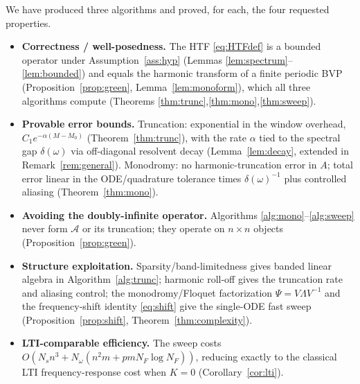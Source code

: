 \documentclass{amsart}
\theoremstyle{definition}
\newcommand{\Acal}{\mathcal{A}}
\begin{document}
We have produced three algorithms and proved, for each, the four requested
properties.
\begin{itemize}
\item \textbf{Correctness / well-posedness.} The HTF \eqref{eq:HTFdef} is a
bounded operator under Assumption~\ref{ass:hyp} (Lemmas
\ref{lem:spectrum}--\ref{lem:bounded}) and equals the harmonic transform of a
finite periodic BVP (Proposition~\ref{prop:green}, Lemma~\ref{lem:monoform}),
which all three algorithms compute (Theorems
\ref{thm:trunc},\ref{thm:mono},\ref{thm:sweep}).
\item \textbf{Provable error bounds.} Truncation: exponential in the window
overhead, $C_1 e^{-\alpha(M-M_0)}$ (Theorem~\ref{thm:trunc}), with the rate
$\alpha$ tied to the spectral gap $\delta(\omega)$ via off-diagonal resolvent
decay (Lemma~\ref{lem:decay}, extended in Remark~\ref{rem:general}). Monodromy:
no harmonic-truncation error in $A$; total error linear in the ODE/quadrature
tolerance times $\delta(\omega)^{-1}$ plus controlled aliasing
(Theorem~\ref{thm:mono}).
\item \textbf{Avoiding the doubly-infinite operator.} Algorithms
\ref{alg:mono}--\ref{alg:sweep} never form $\Acal$ or its truncation; they
operate on $n\times n$ objects (Proposition~\ref{prop:green}).
\item \textbf{Structure exploitation.} Sparsity/band-limitedness gives banded
linear algebra in Algorithm~\ref{alg:trunc}; harmonic roll-off gives the
truncation rate and aliasing control; the monodromy/Floquet factorization
$\Psi=V\Lambda V^{-1}$ and the frequency-shift identity \eqref{eq:shift} give the
single-ODE fast sweep (Proposition~\ref{prop:shift},
Theorem~\ref{thm:complexity}).
\item \textbf{LTI-comparable efficiency.} The sweep costs
$O(N_s n^3 + N_\omega(n^2m + pmN_F\log N_F))$, reducing exactly to the classical
LTI frequency-response cost when $K=0$ (Corollary~\ref{cor:lti}).
\end{itemize}
\end{document}
